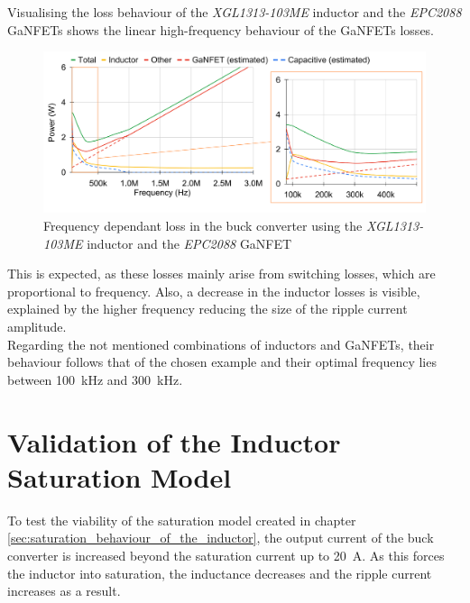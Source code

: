 Visualising the loss behaviour of the \textit{XGL1313-103ME} inductor and the \textit{EPC2088} \acp{GaNFET} shows the linear high-frequency behaviour of the \acp{GaNFET} losses. 
\begin{figure}[H]
        \includegraphics[width=1\textwidth]{Bilder/Kapitel4/BC_Meas_Losses_in_XGL103.png}
        \caption{Frequency dependant loss in the buck converter using the \textit{XGL1313-103ME} inductor and the \textit{EPC2088} \ac{GaNFET}}
        \label{fig:bc_losses_measured}							
\end{figure}
This is expected, as these losses mainly arise from switching losses, which are proportional to frequency. Also, a decrease in the inductor losses is visible, explained by the higher frequency reducing the size of the ripple current amplitude. \\
Regarding the not mentioned combinations of inductors and \acp{GaNFET}, their behaviour follows that of the chosen example and their optimal frequency lies between \SI{100}{\kilo\Hz} and \SI{300}{\kilo\Hz}. 

\section{Validation of the Inductor Saturation Model}\label{sec:validation_of_the_inductor_saturation_model}
To test the viability of the saturation model created in chapter \ref{sec:saturation_behaviour_of_the_inductor}, the output current of the buck converter is increased beyond the saturation current up to \SI{20}{A}. As this forces the inductor into saturation, the inductance decreases and the ripple current increases as a result. 
